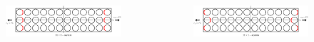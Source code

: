 \documentclass[first,firstsupp,lastsupp,last,hyperref,table]{ETHclass}
\begin{document}
\begin{frame}
\begin{columns}[c]
\begin{column}{0.5\textwidth}
\begin{figure}
\end{figure}
\end{column}
\end{columns}
\vspace{-0.35cm}
\begin{columns}[c]
\centering
\begin{column}{0.5\textwidth}
\centering
\begin{figure}
\centering
\includegraphics[width=1.12\columnwidth]{twofibers-sameside-strainmagni11.pdf}
\end{figure}
\end{column}
\begin{column}{0.5\textwidth}
\centering
\begin{figure}
\centering
\includegraphics[width=1.12\columnwidth]{twofibers-oppositeside-strainmagni11.pdf}
\end{figure}
\end{column}
\end{columns}
\end{frame}

\addtocounter{framenumber}{-1}
\end{document}

